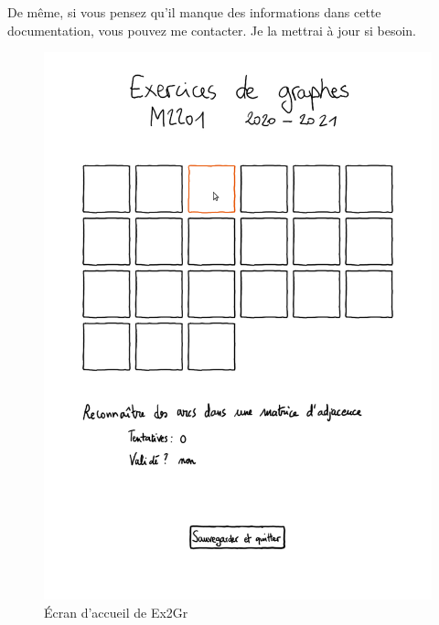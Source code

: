 \documentclass[a4paper]{article}
\begin{document}
De même, si vous pensez qu'il manque des informations dans cette documentation, vous pouvez me contacter.
Je la mettrai à jour si besoin.

\begin{figure}[htbp]
  \centering
\includegraphics[width=12cm]{welcome.png}
\caption{Écran d'accueil de Ex2Gr}\label{fig:welcomescreen}
\end{figure}
\end{document}
